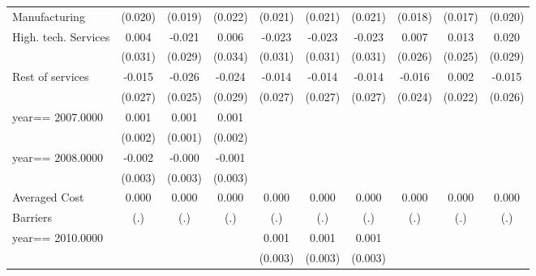 \begin{table}[htbp]
\begin{tabular}{l*{9}{c}}
Manufacturing       &     (0.020)   &     (0.019)   &     (0.022)   &     (0.021)   &     (0.021)   &     (0.021)   &     (0.018)   &     (0.017)   &     (0.020)   \\
High. tech. Services&       0.004   &      -0.021   &       0.006   &      -0.023   &      -0.023   &      -0.023   &       0.007   &       0.013   &       0.020   \\
                    &     (0.031)   &     (0.029)   &     (0.034)   &     (0.031)   &     (0.031)   &     (0.031)   &     (0.026)   &     (0.025)   &     (0.029)   \\
Rest of services    &      -0.015   &      -0.026   &      -0.024   &      -0.014   &      -0.014   &      -0.014   &      -0.016   &       0.002   &      -0.015   \\
                    &     (0.027)   &     (0.025)   &     (0.029)   &     (0.027)   &     (0.027)   &     (0.027)   &     (0.024)   &     (0.022)   &     (0.026)   \\
year==  2007.0000   &       0.001   &       0.001   &       0.001   &               &               &               &               &               &               \\
                    &     (0.002)   &     (0.001)   &     (0.002)   &               &               &               &               &               &               \\
year==  2008.0000   &      -0.002   &      -0.000   &      -0.001   &               &               &               &               &               &               \\
                    &     (0.003)   &     (0.003)   &     (0.003)   &               &               &               &               &               &               \\
Averaged Cost       &       0.000   &       0.000   &       0.000   &       0.000   &       0.000   &       0.000   &       0.000   &       0.000   &       0.000   \\
Barriers            &         (.)   &         (.)   &         (.)   &         (.)   &         (.)   &         (.)   &         (.)   &         (.)   &         (.)   \\
year==  2010.0000   &               &               &               &       0.001   &       0.001   &       0.001   &               &               &               \\
                    &               &               &               &     (0.003)   &     (0.003)   &     (0.003)   &               &               &               \\

\end{tabular}
\end{table}
